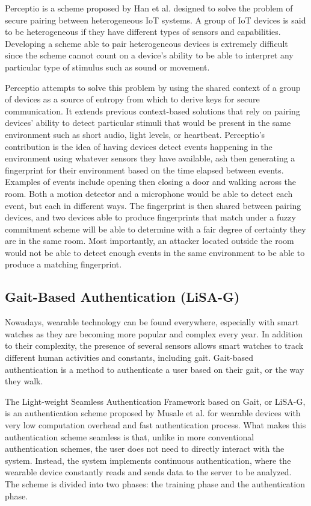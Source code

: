 \documentclass[10pt,twocolumn,letterpaper]{article}
\begin{document}
Perceptio is a scheme proposed by Han et al. \cite{perceptio} designed to solve the problem of secure pairing between heterogeneous IoT systems. A group of IoT devices is said to be heterogeneous if they have different types of sensors and capabilities. Developing a scheme able to pair heterogeneous devices is extremely difficult since the scheme cannot count on a device’s ability to be able to interpret any particular type of stimulus such as sound or movement. 

Perceptio attempts to solve this problem by using the shared context of a group of devices as a source of entropy from which to derive keys for secure communication. It extends previous context-based solutions that rely on pairing devices’ ability to detect particular stimuli that would be present in the same environment such as short audio, light levels, or heartbeat. Perceptio’s contribution is the idea of having devices detect events happening in the environment using whatever sensors they have available, ash then generating a fingerprint for their environment based on the time elapsed between events.  Examples of events include opening then closing a door and walking across the room. Both a motion detector and a microphone would be able to detect each event, but each in different ways. The fingerprint is then shared between pairing devices, and two devices able to produce fingerprints that match under a fuzzy commitment scheme will be able to determine with a fair degree of certainty they are in the same room. Most importantly, an attacker located outside the room would not be able to detect enough events in the same environment to be able to produce a matching fingerprint.

\subsection{Gait-Based Authentication (LiSA-G)}

Nowadays, wearable technology can be found everywhere, especially with smart watches as they are becoming more popular and complex every year. In addition to their complexity, the presence of several sensors allows smart watches to track different human activities and constants, including gait. Gait-based authentication is a method to authenticate a user based on their gait, or the way they walk.

The Light-weight Seamless Authentication Framework based on Gait, or LiSA-G, is an authentication scheme proposed by Musale et al. \cite{lisag} for wearable devices with very low computation overhead and fast authentication process. What makes this authentication scheme seamless is that, unlike in more conventional authentication schemes, the user does not need to directly interact with the system. Instead, the system implements continuous  authentication, where the wearable device constantly reads and sends data to the server to be analyzed. The scheme is divided into two phases: the training phase and the authentication phase.
\end{document}
